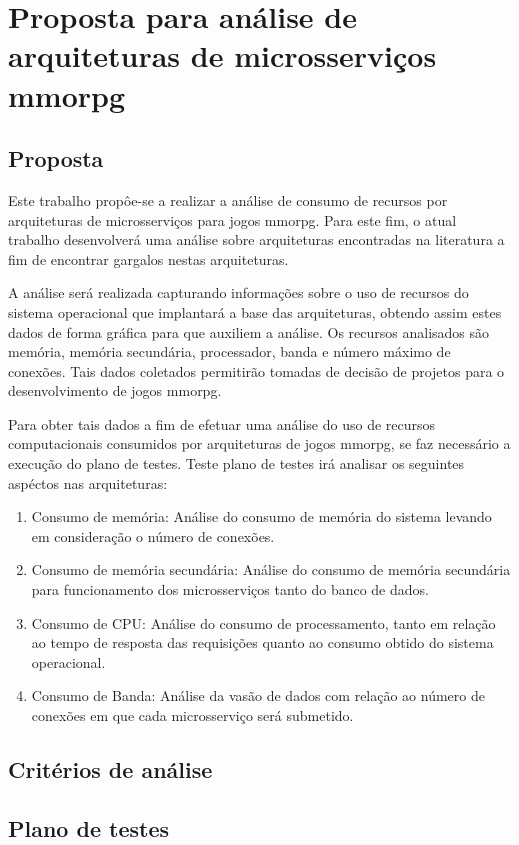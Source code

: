 \chapter{Proposta para análise de arquiteturas de microsserviços \ac{mmorpg}}
\label{cap3}

\section{Proposta}

Este trabalho propôe-se a realizar a análise de consumo de recursos por arquiteturas de microsserviços para jogos \ac{mmorpg}.
%
Para este fim, o atual trabalho desenvolverá uma análise sobre arquiteturas encontradas na literatura a fim de encontrar gargalos nestas arquiteturas.


A análise será realizada capturando informações sobre o uso de recursos do sistema operacional que implantará a base das arquiteturas, obtendo assim estes dados de forma gráfica para que auxiliem a análise.
%
Os recursos analisados são memória, memória secundária, processador, banda e número máximo de conexões.
%
Tais dados coletados permitirão tomadas de decisão de projetos para o desenvolvimento de jogos \ac{mmorpg}.


Para obter tais dados a fim de efetuar uma análise do uso de recursos computacionais consumidos por arquiteturas de jogos \ac{mmorpg}, se faz necessário a execução do plano de testes.
%
Teste plano de testes irá analisar os seguintes aspéctos nas arquiteturas:

\begin{enumerate}
  \item Consumo de memória: Análise do consumo de memória do sistema levando em consideração o número de conexões.
  \item Consumo de memória secundária: Análise do consumo de memória secundária para funcionamento dos microsserviços tanto do banco de dados.
  \item Consumo de CPU: Análise do consumo de processamento, tanto em relação ao tempo de resposta das requisições quanto ao consumo obtido do sistema operacional.
  \item Consumo de Banda: Análise da vasão de dados com relação ao número de conexões em que cada microsserviço será submetido.
\end{enumerate}

\section{Critérios de análise}

\section{Plano de testes}
